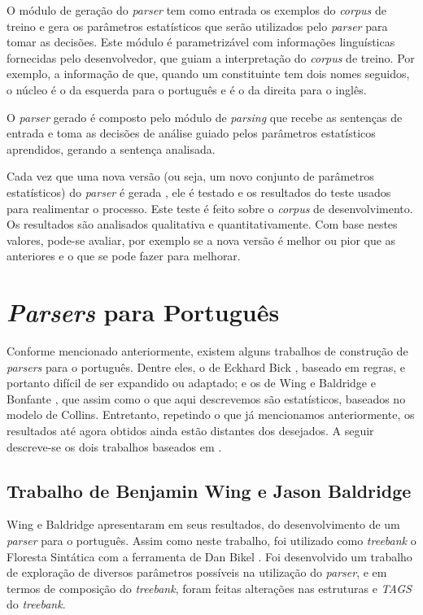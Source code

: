 O módulo de geração do \emph{parser} tem como entrada os exemplos do \emph{corpus} de treino e gera os parâmetros estatísticos que serão utilizados pelo \emph{parser} para tomar as decisões. Este módulo é parametrizável com informações linguísticas fornecidas pelo desenvolvedor, que guiam a interpretação do \emph{corpus} de treino. Por exemplo, a informação de que, quando um constituinte tem dois nomes seguidos, o núcleo é o da esquerda para o português e é o da direita para o inglês.

O \emph{parser} gerado é composto pelo módulo de \emph{parsing} que recebe as sentenças de entrada e toma as decisões de análise guiado pelos parâmetros estatísticos aprendidos, gerando a sentença analisada.

Cada vez que uma nova versão (ou seja, um novo conjunto de parâmetros estatísticos) do \emph{parser} é gerada , ele é testado e os resultados do teste usados para realimentar o processo. Este teste é feito sobre o \emph{corpus} de desenvolvimento. Os resultados são analisados qualitativa e quantitativamente. Com base nestes valores, pode-se avaliar, por exemplo se a nova versão é melhor ou pior que as anteriores e o que se pode fazer para melhorar.


\section{\emph{Parsers} para Português} %
\label{sec:parsers_para_portugues}

Conforme mencionado anteriormente, existem alguns trabalhos de construção de \emph{parsers} para o português. Dentre eles, o de Eckhard Bick \cite{bick00}, baseado em regras, e portanto difícil de ser expandido ou adaptado; e os de Wing e Baldridge \cite{baldridge06} e Bonfante \cite{bonfante03}, que assim como o que aqui descrevemos são estatísticos, baseados no modelo de Collins. Entretanto, repetindo o que já mencionamos anteriormente, os resultados até agora obtidos ainda estão distantes dos desejados. A seguir descreve-se os dois trabalhos baseados em \cite{collins99}.


\subsection{Trabalho de Benjamin Wing e Jason Baldridge} %
\label{sec:wing_baldridge}

Wing e Baldridge apresentaram  em \cite{baldridge06} seus resultados, do desenvolvimento de um \emph{parser} para o português. Assim como neste trabalho, foi utilizado como \emph{treebank} o Floresta Sintática com a ferramenta de Dan Bikel \cite{bikel02}. Foi desenvolvido um trabalho de exploração de diversos parâmetros possíveis na utilização do \emph{parser}, e em termos de composição do \emph{treebank}, foram feitas alterações nas estruturas e \emph{TAGS} do \emph{treebank}.

